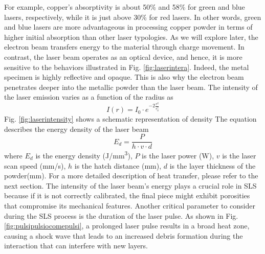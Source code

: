 For example, copper's absorptivity is about 50\% and 58\% for green and blue lasers, respectively, while it is just above 30\% for red lasers. In other words, green and blue lasers are more advantageous in processing copper powder in terms of higher initial absorption than other laser typologies. As we will explore later, the electron beam transfers energy to the material through charge movement. In contrast, the laser beam operates as an optical device, and hence, it is more sensitive to the behaviors illustrated in Fig. \ref{fig:laserintera}. Indeed, the metal specimen is highly reflective and opaque. This is also why the electron beam penetrates deeper into the metallic powder than the laser beam. The intensity of the laser emission varies as a function of the radius as 
\begin{equation}
    \label{eq:intensitylaser}
    I(r)=I_0\cdot e^{-2 \frac{r^2}{r_0^2}}
\end{equation}
Fig. \ref{fig:laserintensity} shows a schematic representation of density
The equation describes the energy density of the laser beam
\begin{equation}
    \label{eq:energydensity}
    E_d = \frac{P}{h\cdot v \cdot d}
\end{equation}
where $E_d$ is the energy density (\unit{\joule/\milli\metre^3}), $P$ is the laser power (\unit{\watt}), $v$ is the laser scan speed (\unit{\milli\metre / \second}), $h$ is the hatch distance (\unit{\milli\metre}), $d$ is the layer thickness of the powder(\unit{\milli\metre}). For a more detailed description of heat transfer, please refer to the next section. The intensity of the laser beam's energy plays a crucial role in SLS because if it is not correctly calibrated, the final piece might exhibit porosities that compromise its mechanical features. Another critical parameter to consider during the SLS process is the duration of the laser pulse. As shown in Fig. \ref{fig:pulsipulsiocomepulsi}, a prolonged laser pulse results in a broad heat zone, causing a shock wave that leads to an increased debris formation during the interaction that can interfere with new layers.
